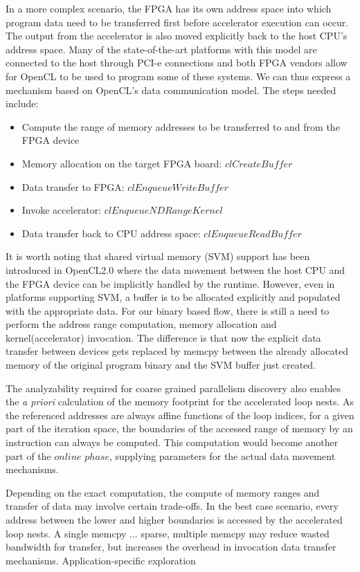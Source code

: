 In a more complex scenario, the FPGA has its own address space into which program data need to be transferred first before accelerator execution can occur. The output from the accelerator
is also moved explicitly back to the host CPU's address space.
Many of the state-of-the-art platforms with this model
are connected to the host through PCI-e connections and both FPGA vendors allow for
OpenCL to be used to program some of these systems. We can thus express
a mechanism based on OpenCL's data communication model. 
The steps needed include: 
\begin{itemize}
    \item Compute the range of memory addresses to be transferred to and from the FPGA device
    \item Memory allocation on the target FPGA board: $clCreateBuffer$ 
    \item Data transfer to FPGA: $clEnqueueWriteBuffer$
    \item Invoke accelerator: $clEnqueueNDRangeKernel$
    \item Data transfer back to CPU address space: $clEnqueueReadBuffer$
\end{itemize} 

It is worth noting that shared virtual memory (SVM) support has been introduced in OpenCL2.0 where the data movement between the host CPU and the FPGA device can be implicitly handled by the runtime. However, even
in platforms supporting SVM, a buffer is to be allocated explicitly and populated with the appropriate data. For our 
binary based flow, there is still a need to perform the address range computation, memory allocation and kernel(accelerator) invocation. The difference is that now the explicit data transfer between devices gets
replaced by memcpy between the already allocated memory of the original program binary and the SVM buffer just created. 


The analyzability required for coarse grained parallelism discovery 
also enables the \textit{a priori} calculation of the  memory footprint for the accelerated loop nests. As the referenced addresses are always affine functions of the loop indices, for a given part of the iteration space, the boundaries of the accessed range of memory by an instruction can always be
computed. This computation would become another part of the $online$ $phase$, supplying parameters for the actual data movement mechanisms. 


Depending on
the exact computation, the compute of memory ranges and transfer of data
may involve certain trade-offs.
In the best case scenario, every address between the lower and higher boundaries is accessed by the accelerated loop nests. A single memcpy ...
sparse, multiple memcpy may reduce wasted bandwidth for transfer, but increases the overhead in invocation data transfer mechanisms. Application-specific exploration



